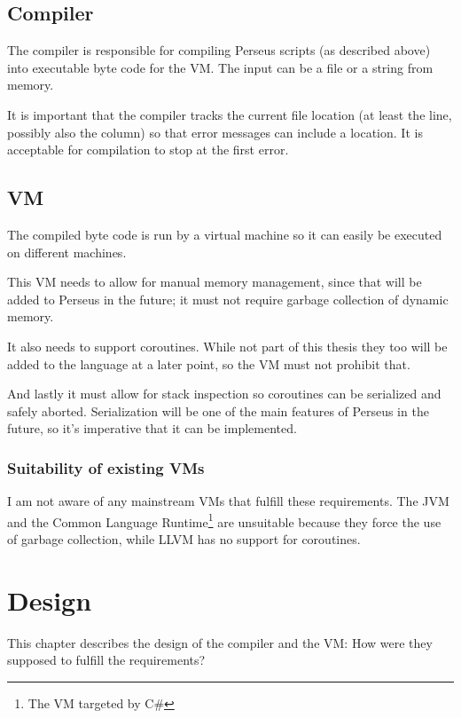 	
	\section{Compiler}
		
		The compiler is responsible for compiling Perseus scripts (as described above) into executable byte code for the VM. The input can be a file or a string from memory.
		
		It is important that the compiler tracks the current file location (at least the line, possibly also the column) so that error messages can include a location. It is acceptable for compilation to stop at the first error.
	
	\section{VM}
	
		The compiled byte code is run by a virtual machine so it can easily be executed on different machines.
		
		This VM needs to allow for manual memory management, since that will be added to Perseus in the future; it must not require garbage collection of dynamic memory.
		
		It also needs to support coroutines. While not part of this thesis they too will be added to the language at a later point, so the VM must not prohibit that.
		
		And lastly it must allow for stack inspection so coroutines can be serialized and safely aborted. Serialization will be one of the main features of Perseus in the future, so it's imperative that it can be implemented.
		
		\subsection{Suitability of existing VMs}
		
			I am not aware of any mainstream VMs that fulfill these requirements. The JVM and the Common Language Runtime\footnote{The VM targeted by C\#} are unsuitable because they force the use of garbage collection, while LLVM has no support for coroutines.

\chapter{Design} %

	This chapter describes the design of the compiler and the VM: How were they supposed to fulfill the requirements?

